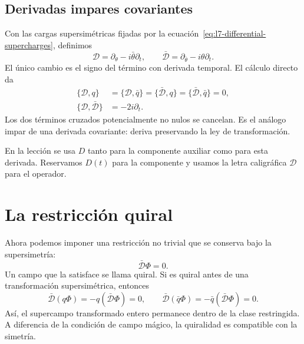 \begin{classroomqa}
\end{classroomqa}

\subsection{Derivadas impares covariantes}

Con las cargas supersimétricas fijadas por la ecuación~\eqref{eq:l7-differential-supercharges}, definimos
\begin{equation}
\mathcal D=\partial_\theta-i\bar\theta\partial_t,
\qquad
\bar{\mathcal D}=\partial_{\bar\theta}-i\theta\partial_t.
\label{eq:l7-covariant-derivatives}
\end{equation}
El único cambio es el signo del término con derivada temporal. El cálculo directo da
\begin{align}
\{\mathcal D,q\}
&=\{\mathcal D,\bar q\}
=\{\bar{\mathcal D},q\}
=\{\bar{\mathcal D},\bar q\}=0,\\
\{\mathcal D,\bar{\mathcal D}\}&=-2i\partial_t.
\label{eq:l7-covariant-algebra}
\end{align}
Los dos términos cruzados potencialmente no nulos se cancelan. Es el análogo impar de una derivada covariante: deriva preservando la ley de transformación.

En la lección se usa \(D\) tanto para la componente auxiliar como para esta derivada. Reservamos \(D(t)\) para la componente y usamos la letra caligráfica \(\mathcal D\) para el operador.

\section{La restricción quiral}

Ahora podemos imponer una restricción no trivial que se conserva bajo la supersimetría:
\begin{equation}
\bar{\mathcal D}\Phi=0.
\label{eq:l7-chiral-constraint}
\end{equation}
Un campo que la satisface se llama quiral. Si es quiral antes de una transformación supersimétrica, entonces
\begin{equation}
\bar{\mathcal D}(q\Phi)
=-q(\bar{\mathcal D}\Phi)=0,
\qquad
\bar{\mathcal D}(\bar q\Phi)
=-\bar q(\bar{\mathcal D}\Phi)=0.
\end{equation}
Así, el supercampo transformado entero permanece dentro de la clase restringida. A diferencia de la condición de campo mágico, la quiralidad es compatible con la simetría.


